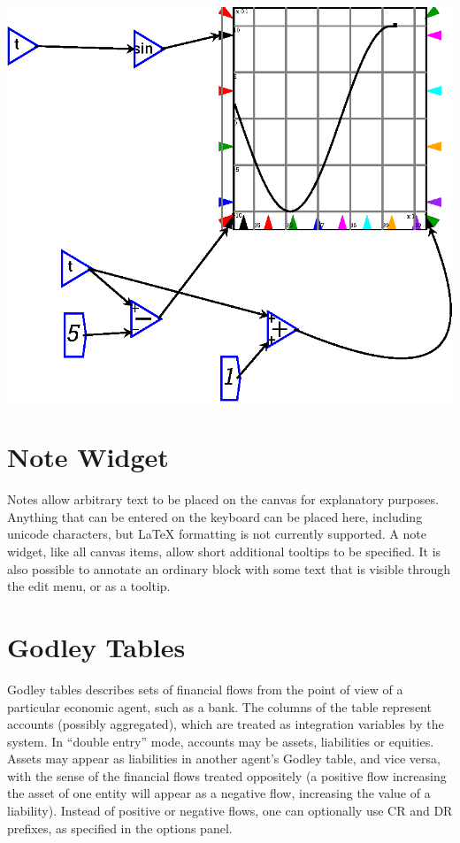 \begin{description}
\begin{center}
\includegraphics{images/plotSlidingWindow.eps}
\end{center}
\end{description}

\section{Note Widget}
 \label{Notes}\label{Item} Notes allow arbitrary text to be
placed on the canvas for explanatory purposes. Anything that can be
entered on the keyboard can be placed here, including unicode
characters, but LaTeX formatting is not currently supported. A note
widget, like all canvas items, allow short additional tooltips to be
specified. It is also possible to annotate an ordinary block with some text
that is visible through the edit menu, or as a tooltip.

\section{Godley Tables}\label{godley}\label{GodleyIcon}

Godley tables describes sets of financial flows from the point of view
of a particular economic agent, such as a bank. The columns of the
table represent accounts (possibly aggregated), which are treated as
integration variables by the system. In ``double entry'' mode,
accounts may be assets, liabilities or equities. Assets may appear as
liabilities in another agent's Godley table, and vice versa, with the
sense of the financial flows treated oppositely (a positive flow increasing the
asset of one entity will appear as a negative flow, increasing the
value of a liability). Instead of positive or negative flows, one can
optionally use CR and DR prefixes, as specified in the options panel.

